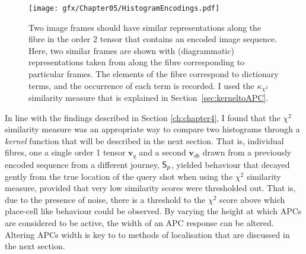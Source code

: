 \begin{figure}
\centering
\texttt{[image: gfx/Chapter05/HistogramEncodings.pdf]}
\caption{Two image frames should have similar representations along the fibre in the order 2 tensor that contains an encoded image sequence.  Here, two similar frames are shown with (diagrammatic) representations taken from along the fibre corresponding to particular frames.  The elements of the fibre correspond to dictionary terms, and the occurrence of each term is recorded.  I used the $\kappa_{\chi^2}$ similarity measure that is explained in Section~\ref{sec:kerneltoAPC}.}
\label{fig:HistEncodings}
\end{figure}


In line with the findings described in Section \ref{ch:chapter4}, I found that the $\chi^2$ similarity measure was an appropriate way to compare two histograms through a \textit{kernel} function that will be described in the next section. That is, individual fibres, one a single order 1 tensor $\mathbf{v}_q$ and a second $\mathbf{v}_{db}$ drawn from a previously encoded sequence from a different journey, $\mathsf{S}_p$, yielded behaviour that decayed gently from the true location of the query shot when using the $\chi^2$ similarity measure, provided that very low similarity scores were thresholded out.  That is, due to the presence of noise, there is a threshold to the $\chi^2$ score above which place-cell like behaviour could be observed.  By varying the height at which APCs are considered to be active, the width of an APC response can be altered.  Altering APCs width is key to to methods of localisation that are discussed in the next section.  



